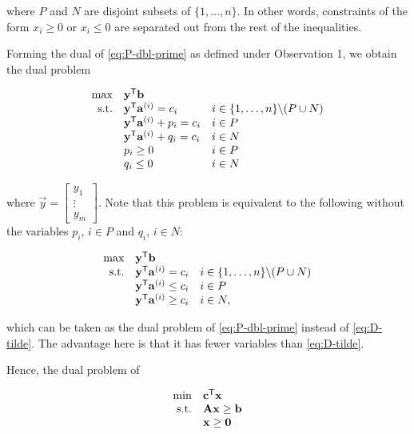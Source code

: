 where \(P\) and \(N\) are disjoint subsets of \(\{1,\ldots,n\}\). In
other words, constraints of the form \(x_i \geq 0\) or \(x_i \leq 0\)
are separated out from the rest of the inequalities.

Forming the dual of \eqref{eq:P-dbl-prime} as defined under Observation 1,
we obtain the dual problem

\begin{equation}
\begin{array}{rll}
\max & \mathbf{y}^{\mathsf{T}}\mathbf{b} \\
\mbox{s.t.} & 
 \mathbf{y}^{\mathsf{T}}\mathbf{a}^{(i)} = c_i & i \in \{1,\ldots,n\}\backslash 
(P\cup N) \\
&\mathbf{y}^{\mathsf{T}}\mathbf{a}^{(i)} + p_i = c_i & i \in P \\
& \mathbf{y}^{\mathsf{T}}\mathbf{a}^{(i)} + q_i = c_i & i \in N \\
& p_i \geq 0 & i \in P \\
& q_i \leq 0 & i \in N \\
\end{array} \label{eq:D-tilde}
\end{equation}

where \(\vec{y} = \begin{bmatrix} y_1\\ \vdots \\ y_m\end{bmatrix}\).
Note that this problem is equivalent to the following without the
variables \(p_i\), \(i \in P\) and \(q_i\), \(i \in N\):

\begin{equation}
\begin{array}{rll}
\max & \mathbf{y}^{\mathsf{T}}\mathbf{b} \\
\mbox{s.t.} & 
 \mathbf{y}^{\mathsf{T}}\mathbf{a}^{(i)} = c_i & i \in \{1,\ldots,n\}\backslash 
(P\cup N) \\
&\mathbf{y}^{\mathsf{T}}\mathbf{a}^{(i)} \leq c_i & i \in P      \\
& \mathbf{y}^{\mathsf{T}}\mathbf{a}^{(i)} \geq c_i & i \in N,     \\
\end{array}
\end{equation}

which can be taken as the dual problem of \eqref{eq:P-dbl-prime} instead
of \eqref{eq:D-tilde}. The advantage here is that it has fewer variables
than \eqref{eq:D-tilde}.

Hence, the dual problem of

\begin{equation*}
\begin{array}{rl}
\min & \mathbf{c}^{\mathsf{T}}\mathbf{x}  \\
\mbox{s.t.} & \mathbf{A}\mathbf{x} \geq \mathbf{b} \\
& \mathbf{x} \geq \mathbf{0}
\end{array}
\end{equation*}

